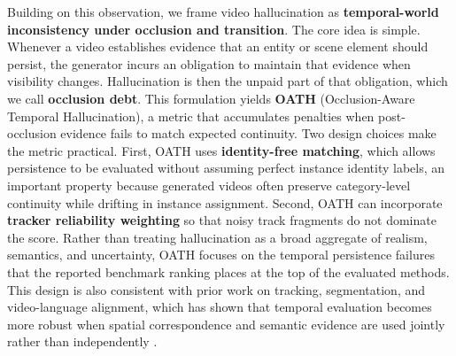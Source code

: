 \documentclass{article}
\begin{document}
Building on this observation, we frame video hallucination as \textbf{temporal-world inconsistency under occlusion and transition}. The core idea is simple. Whenever a video establishes evidence that an entity or scene element should persist, the generator incurs an obligation to maintain that evidence when visibility changes. Hallucination is then the unpaid part of that obligation, which we call \textbf{occlusion debt}. This formulation yields \textbf{OATH} (Occlusion-Aware Temporal Hallucination), a metric that accumulates penalties when post-occlusion evidence fails to match expected continuity. Two design choices make the metric practical. First, OATH uses \textbf{identity-free matching}, which allows persistence to be evaluated without assuming perfect instance identity labels, an important property because generated videos often preserve category-level continuity while drifting in instance assignment. Second, OATH can incorporate \textbf{tracker reliability weighting} so that noisy track fragments do not dominate the score. Rather than treating hallucination as a broad aggregate of realism, semantics, and uncertainty, OATH focuses on the temporal persistence failures that the reported benchmark ranking places at the top of the evaluated methods. This design is also consistent with prior work on tracking, segmentation, and video-language alignment, which has shown that temporal evaluation becomes more robust when spatial correspondence and semantic evidence are used jointly rather than independently \cite{deepsort2017,bytetrack2022,sam2023,xmem2022,clip2021}.
\end{document}
